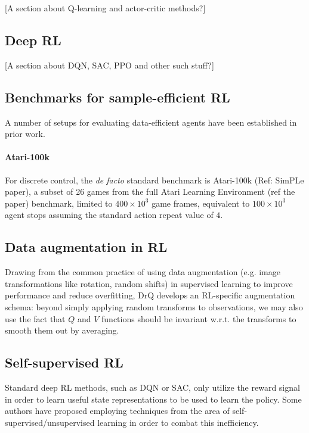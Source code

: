 \documentclass[twoside,11pt]{article}
\begin{document}
  [A section about Q-learning and actor-critic methods?]

\subsection{Deep RL}

[A section about DQN, SAC, PPO and other such stuff?]

\subsection{Benchmarks for sample-efficient RL}

A number of setups for evaluating data-efficient agents have been established in prior work.

\paragraph{Atari-100k} For discrete control, the \emph{de facto} standard benchmark is Atari-100k (Ref: SimPLe paper), a subset of 26 games from the full Atari Learning Environment (ref the paper) benchmark, limited to $400\times 10^3$ game frames, equivalent to $100 \times 10^3$ agent stops assuming the standard action repeat value of $4$.

\subsection{Data augmentation in RL}

Drawing from the common practice of using data augmentation (e.g. image transformations like rotation, random shifts) in supervised learning to improve performance and reduce overfitting, DrQ develops an RL-specific augmentation schema: beyond simply applying random transforms to observations, we may also use the fact that $Q$ and $V$ functions should be invariant w.r.t. the transforms to smooth them out by averaging.

\subsection{Self-supervised RL}

Standard deep RL methods, such as DQN or SAC, only utilize the reward signal in order to learn useful state representations to be used to learn the policy. Some authors have proposed employing techniques from the area of self-supervised/unsupervised learning in order to combat this inefficiency.
\end{document}
